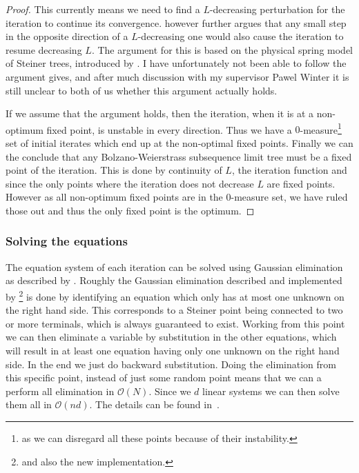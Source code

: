 \begin{proof}
This currently means we need to find a $L$-decreasing perturbation for
the iteration to continue its convergence. \citeauthor{smith1992} however
further argues that any small step in the opposite direction of a $L$-decreasing
one would also cause the iteration to resume decreasing $L$. The argument for
this is based on the physical spring model of Steiner trees, introduced by
\textcite{gilbert1968}. I have unfortunately not been able to follow the
argument \textcite{smith1992} gives, and after much discussion with my
supervisor Pawel Winter it is still unclear to both of us whether this argument
actually holds.

If we assume that the argument holds, then the iteration, when it is at a
non-optimum fixed point, is unstable in every direction. Thus we have a
$0$-measure\footnote{as we can disregard all these points because of their
  instability.} set of initial iterates which end up at the non-optimal fixed
points. Finally we can the conclude that any Bolzano-Weierstrass subsequence
limit tree must be a fixed point of the iteration. This is done by continuity of
$L$, the iteration function and since the only points where the iteration does
not decrease $L$ are fixed points. However as all non-optimum fixed points are
in the 0-measure set, we have ruled those out and thus the only fixed point is
the optimum.

\end{proof}

\subsubsection{Solving the equations}
\label{sec:solving-equations}

The equation system of each iteration can be solved using Gaussian elimination
as described by \textcite[p.~148--149]{smith1992}. Roughly the Gaussian
elimination described and implemented by \citeauthor{smith1992}\footnote{and
  also the new implementation.} is done by identifying an equation which only
has at most one unknown on the right hand side. This corresponds to a Steiner
point being connected to two or more terminals, which is always guaranteed to
exist. Working from this point we can then eliminate a variable by substitution
in the other equations, which will result in at least one equation having only
one unknown on the right hand side. In the end we just do backward substitution.
Doing the elimination from this specific point, instead of just some random
point means that we can a perform all elimination in $\mathcal O(N)$. Since we
$d$ linear systems we can then solve them all in $\mathcal{O}(n d)$. The details
can be found in~\cite[p.~148--149]{smith1992}.

